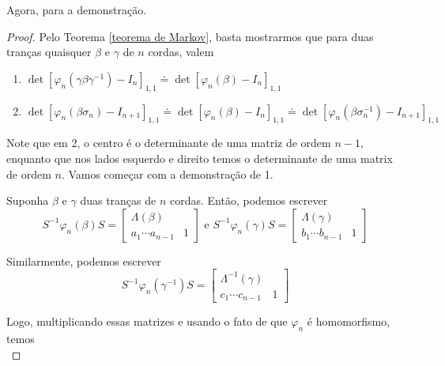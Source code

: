 	\par\vspace{0.3cm} Agora, para a demonstração.
	\begin{proof}
		Pelo Teorema \eqref{teorema de Markov}, basta mostrarmos que para duas tranças quaisquer $\beta$ e $\gamma$ de $n$ cordas, valem
		\begin{enumerate}
			\item $\det[\varphi_n(\gamma\beta\gamma^{-1}) - I_n]_{1,1} \doteq \det[\varphi_n(\beta) - I_n]_{1,1}$
			\item $\det[\varphi_n(\beta\sigma_n) - I_{n+1}]_{1,1}\doteq\det[\varphi_n(\beta) - I_n]_{1,1} \doteq \det[\varphi_n(\beta\sigma_n^{-1}) - I_{n+1}]_{1,1}$
		\end{enumerate}
		\par\vspace{0.3cm} Note que em 2, o centro é o determinante de uma matriz de ordem $n-1$, enquanto que nos lados esquerdo e direito temos o determinante de uma matrix de ordem $n$. Vamos começar com a demonstração de 1.
		\par\vspace{0.3cm} Suponha $\beta$ e $\gamma$ duas tranças de $n$ cordas. Então, podemos escrever
		\begin{equation*}
		S^{-1}\varphi_n(\beta)S = \left[ \begin{array}{c|c}
		\Lambda(\beta) & \\
		\hline
		a_1\cdots a_{n-1} & 1
		\end{array}\right] \text{ e } 
		S^{-1}\varphi_n(\gamma)S = \left[  \begin{array}{c|c}
		\Lambda(\gamma) & \\
		\hline 
		b_1 \cdots b_{n-1} & 1
		\end{array}\right]  
		\end{equation*}
		\par\vspace{0.3cm} Similarmente, podemos escrever
		\begin{equation*}
		S^{-1}\varphi_n(\gamma^{-1})S = \left[\begin{array}{c|c}
		\Lambda^{-1}(\gamma) & \\
		\hline 
		c_1\cdots c_{n-1} & 1
		\end{array}\right]
		\end{equation*}
		\par\vspace{0.3cm} Logo, multiplicando essas matrizes e usando o fato de que $\varphi_n$ é homomorfismo, temos
		\begin{equation*}

\end{equation*}
\end{proof}
